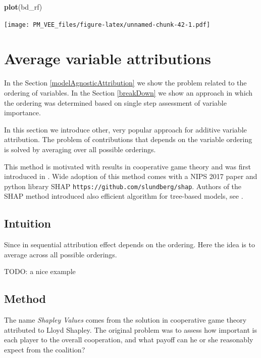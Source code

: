 \documentclass[]{krantz}
\newenvironment{Shaded}{\begin{snugshade}}{\end{snugshade}}
\newcommand{\KeywordTok}[1]{\textcolor[rgb]{0.13,0.29,0.53}{\textbf{#1}}}
\newcommand{\NormalTok}[1]{#1}
\theoremstyle{definition}
\theoremstyle{definition}
\theoremstyle{definition}
\theoremstyle{remark}
\begin{document}
\begin{Shaded}
\begin{Highlighting}[]
\KeywordTok{plot}\NormalTok{(bd_rf) }
\end{Highlighting}
\end{Shaded}

\texttt{[image: PM\_VEE\_files/figure-latex/unnamed-chunk-42-1.pdf]}

\hypertarget{shapley}{%
\section{Average variable attributions}\label{shapley}}

In the Section \ref{modelAgnosticAttribution} we show the problem
related to the ordering of variables. In the Section \ref{breakDown} we
show an approach in which the ordering was determined based on single
step assessment of variable importance.

In this section we introduce other, very popular approach for additive
variable attribution. The problem of contributions that depends on the
variable ordering is solved by averaging over all possible orderings.

This method is motivated with results in cooperative game theory and was
first introduced in \citep{Strumbelj2014}. Wide adoption of this method
comes with a NIPS 2017 paper \citep{SHAP} and python library SHAP
\texttt{https://github.com/slundberg/shap}. Authors of the SHAP method
introduced also efficient algorithm for tree-based models, see
\citep{TreeSHAP}.

\hypertarget{intuition-4}{%
\subsection{Intuition}\label{intuition-4}}

Since in sequential attribution effect depends on the ordering. Here the
idea is to average across all possible orderings.

TODO: a nice example

\hypertarget{method-3}{%
\subsection{Method}\label{method-3}}

The name \emph{Shapley Values} comes from the solution in cooperative
game theory attributed to Lloyd Shapley. The original problem was to
assess how important is each player to the overall cooperation, and what
payoff can he or she reasonably expect from the coalition?
\citep{shapleybook1952}
\end{document}
